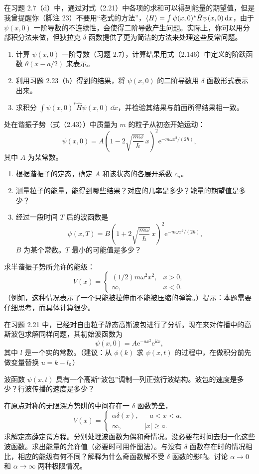 在习题 2.7（d）中，通过对式（2.21）中各项的求和可以得到能量的期望值，但是我曾提醒你（脚注 23）不要用“老式的方法”，$\left\langle H\right\rangle=\int\psi(x,0)^*\hat H\psi(x,0)\,\mathrm{d} x$，由于 $\psi(x,0)$ 一阶导数的不连续性，会使得二阶导数产生问题。实际上，你可以用分部积分法来做，但狄拉克 $\delta$ 函数提供了更为简洁的方法来处理这些反常问题。
\begin{enumerate}
\item 计算 $\psi(x,0)$ 一阶导数（习题 2.7），计算结果用式（2.146）中定义的阶跃函数 $\theta(x-a/2)$ 来表示。
\item 利用习题 2.23（b）得到的结果，将 $\psi(x,0)$ 的二阶导数用 $\delta$ 函数形式表示出来。
\item 求积分 $\int\psi(x,0)^*\hat H\psi(x,0)\,\dd x$，并检验其结果与前面所得结果相一致。
\end{enumerate}
\vfill

处在谐振子势（式（2.43））中质量为 $m$ 的粒子从初态开始运动：
\[
\psi(x,0)=A\left(1-2\sqrt{\frac{m\omega}{\hbar}}\,x\right)^2
\mathrm{e}^{-m\omega x^2/(2\hbar)},
\]
其中 $A$ 为某常数。
\begin{enumerate}
\item 根据谐振子的定态，确定 $A$ 和该状态的各展开系数 $c_n$。
\item 测量粒子的能量，能得到哪些结果？对应的几率是多少？能量的期望值是多少？
\item 经过一段时间 $T$ 后的波函数是
\[
\psi(x,T)=B\left(1+2\sqrt{\frac{m\omega}{\hbar}}\,x\right)^2
\mathrm{e}^{-m\omega x^2/(2\hbar)},
\]
$B$ 为某个常数。$T$ 最小的可能值是多少？
\end{enumerate}
\vfill

求半谐振子势所允许的能级：
\[
V(x)=\begin{cases}(1/2)m\omega^2x^2,&x>0,\\\infty,&x<0.\end{cases}
\]
（例如，这种情况表示了一个只能被拉伸而不能被压缩的弹簧。）提示：本题需要仔细思考，而具体计算很少。
\vfill

在习题 2.21 中，已经对自由粒子静态高斯波包进行了分析。现在来对传播中的高斯波包求解同样问题，其初始波函数为
\[
\psi(x,0)=A\mathrm{e}^{-ax^2}\mathrm{e}^{\mathrm{i}lx},
\]
其中 $l$ 是一个实的常数。（建议：从 $\phi(k)$ 求 $\psi(x,t)$ 的过程中，在做积分前先做变量替换 $u=k-l$。）

波函数 $\psi(x,t)$ 具有一个高斯“波包”调制一列正弦行波结构。波包的速度是多少？行波传播的速度是多少？
\vfill

在原点对称的无限深方势阱的中间存在一 $\delta$ 函数势垒，
\[
V(x)=\begin{cases}\alpha\delta(x),&-a<x<a,\\\infty,&|x|\geq a.\end{cases}
\]
求解定态薛定谔方程。分别处理波函数为偶和奇情况。没必要花时间去归一化这些波函数。求出能量的允许值（必要时可用作图法）。与没有 $\delta$ 函数存在时的情况相比，相应的能级有何不同？解释为什么奇函数解不受 $\delta$ 函数的影响。讨论 $\alpha\to0$ 和 $\alpha\to\infty$ 两种极限情况。
\vfill

